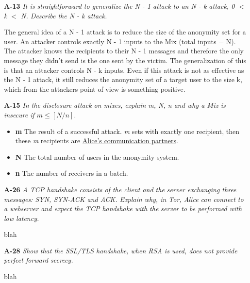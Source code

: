 \documentclass[a4paper]{article}
\newcommand{\Q}[2]{ \vspace{10pt} \textbf{#1} \textit{#2} }
\newcommand{\A}[1]{ #1 }
\begin{document}
\Q{A-13} { %
  It is straightforward to generalize the N - 1 attack to an 
  N - k attack, 0 $<$ k $<$ N. Describe the N - k attack.
}

\A{
  The general idea of a N - 1 attack is to reduce the size of
  the anonymity set for a user. An attacker controls exactly N - 1 
  inputs to the Mix (total inputs = N). The attacker knows
  the recipients to their N - 1 messages and therefore the only 
  message they didn't send is the one sent by the victim.
  The generalization of this is that an attacker controls N - k
  inputs. Even if this attack is not as effective as the N - 1
  attack, it still reduces the anonymity set of a target user 
  to the size k, which from the attackers point of view
  is something positive.  
}

\Q{A-15} {
  In the disclosure attack on mixes, 
  explain m, N, n and why a Mix is insecure if $m \leq [N / n]$.
}

\A{
  \begin{itemize}
    \item \textbf{m} The result of a successful attack. 
    \textit{m} sets with exactly one recipient, then these \textit{m}
    recipients are \underline{Alice's communication partners}. 
    \item \textbf{N} The total number of users in the anonymity system.
    \item \textbf{n} The number of receivers in a batch.
  \end{itemize}
}

\Q{A-26} {
  A TCP handshake consists of the client and the server exchanging 
  three messages: SYN, SYN-ACK and ACK. 
  Explain why, in Tor, Alice can connect to a webserver and expect 
  the TCP handshake with the
  server to be performed with low latency.
}

\A{
  blah
}

\Q{A-28} {
  Show that the SSL/TLS handshake, when RSA is used, 
  does not provide perfect forward secrecy.
}

\A{
  blah
}


\end{document}
